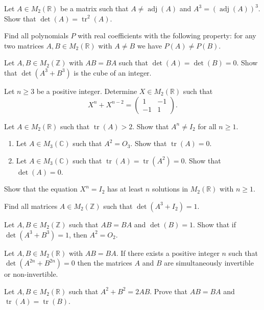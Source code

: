 \documentclass[12pt]{article}
\begin{document}
\begin{problems}
\item Let $A\in M_2(\mathbb{R})$ be a matrix such that $A\ne\operatorname{adj}(A)$ and $A^3 = (\operatorname{adj}(A))^3$. Show that $\det(A)=\operatorname{tr}^2(A)$.

\item Find all polynomials $P$ with real coefficients with the following property: for any two matrices $A,B\in M_2(\mathbb{R})$ with $A\ne B$ we have $P(A)\ne P(B)$.

\item Let $A,B\in M_2(\mathbb{Z})$ with $AB=BA$ such that $\det(A)=\det(B)=0$. Show that $\det(A^3+B^3)$ is the cube of an integer.

\item Let $n\ge 3$ be a positive integer. Determine $X\in M_2(\mathbb{R})$ such that
\[
X^n+X^{n-2} = \begin{pmatrix}1 & -1\\ -1 & 1\end{pmatrix}.
\]

\item Let $A\in M_2(\mathbb{R})$ such that $\operatorname{tr}(A)>2$. Show that $A^n\ne I_2$ for all $n\ge 1$.

\item
\begin{enumerate}[label=(\alph*)]
\item Let $A\in M_3(\mathbb{C})$ such that $A^2=O_3$. Show that $\operatorname{tr}(A)=0$.
\item Let $A\in M_3(\mathbb{C})$ such that $\operatorname{tr}(A)=\operatorname{tr}(A^2)=0$. Show that $\det(A)=0$.
\end{enumerate}

\item Show that the equation $X^n=I_2$ has at least $n$ solutions in $M_2(\mathbb{R})$ with $n\ge 1$.

\item Find all matrices $A\in M_2(\mathbb{Z})$ such that $\det(A^3+I_2)=1$.

\item Let $A,B\in M_2(\mathbb{Z})$ such that $AB=BA$ and $\det(B)=1$. Show that if $\det(A^3+B^3)=1$, then $A^2=O_2$.

\item Let $A,B\in M_2(\mathbb{R})$ with $AB=BA$. If there exists a positive integer $n$ such that $\det(A^{2n}+B^{2n})=0$ then the matrices $A$ and $B$ are simultaneously invertible or non-invertible.

\item Let $A,B\in M_2(\mathbb{R})$ such that $A^2+B^2=2AB$. Prove that $AB=BA$ and $\operatorname{tr}(A)=\operatorname{tr}(B)$.


\end{problems}
\end{document}
